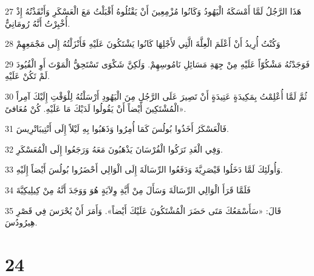 \par 27 هَذَا الرَّجُلُ لَمَّا أَمْسَكَهُ الْيَهُودُ وَكَانُوا مُزْمِعِينَ أَنْ يَقْتُلُوهُ أَقْبَلْتُ مَعَ الْعَسْكَرِ وَأَنْقَذْتُهُ إِذْ أُخْبِرْتُ أَنَّهُ رُومَانِيٌّ.
\par 28 وَكُنْتُ أُرِيدُ أَنْ أَعْلَمَ الْعِلَّةَ الَّتِي لأَجْلِهَا كَانُوا يَشْتَكُونَ عَلَيْهِ فَأَنْزَلْتُهُ إِلَى مَجْمَعِهِمْ
\par 29 فَوَجَدْتُهُ مَشْكُوّاً عَلَيْهِ مِنْ جِهَةِ مَسَائِلِ نَامُوسِهِمْ. وَلَكِنَّ شَكْوَى تَسْتَحِقُّ الْمَوْتَ أَوِ الْقُيُودَ لَمْ تَكُنْ عَلَيْهِ.
\par 30 ثُمَّ لَمَّا أُعْلِمْتُ بِمَكِيدَةٍ عَتِيدَةٍ أَنْ تَصِيرَ عَلَى الرَّجُلِ مِنَ الْيَهُودِ أَرْسَلْتُهُ لِلْوَقْتِ إِلَيْكَ آمِراً الْمُشْتَكِينَ أَيْضاً أَنْ يَقُولُوا لَدَيْكَ مَا عَلَيْهِ. كُنْ مُعَافىً».
\par 31 فَالْعَسْكَرُ أَخَذُوا بُولُسَ كَمَا أُمِرُوا وَذَهَبُوا بِهِ لَيْلاً إِلَى أَنْتِيبَاتْرِيسَ.
\par 32 وَفِي الْغَدِ تَرَكُوا الْفُرْسَانَ يَذْهَبُونَ مَعَهُ وَرَجَعُوا إِلَى الْمُعَسْكَرِ.
\par 33 وَأُولَئِكَ لَمَّا دَخَلُوا قَيْصَرِيَّةَ وَدَفَعُوا الرِّسَالَةَ إِلَى الْوَالِي أَحْضَرُوا بُولُسَ أَيْضاً إِلَيْهِ.
\par 34 فَلَمَّا قَرَأَ الْوَالِي الرِّسَالَةَ وَسَأَلَ مِنْ أَيَّةِ وِلاَيَةٍ هُوَ وَوَجَدَ أَنَّهُ مِنْ كِيلِيكِيَّةَ
\par 35 قَالَ: «سَأَسْمَعُكَ مَتَى حَضَرَ الْمُشْتَكُونَ عَلَيْكَ أَيْضاً». وَأَمَرَ أَنْ يُحْرَسَ فِي قَصْرِ هِيرُودُسَ.

\chapter{24}

